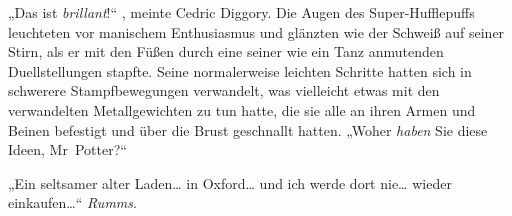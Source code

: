 „Das ist \emph{brillant}!“ , meinte Cedric Diggory. Die Augen des Super-Hufflepuffs leuchteten vor manischem Enthusiasmus und glänzten wie der Schweiß auf seiner Stirn, als er mit den Füßen durch eine seiner wie ein Tanz anmutenden Duellstellungen stapfte. Seine normalerweise leichten Schritte hatten sich in schwerere Stampfbewegungen verwandelt, was vielleicht etwas mit den verwandelten Metallgewichten zu tun hatte, die sie alle an ihren Armen und Beinen befestigt und über die Brust geschnallt hatten. „Woher \emph{haben} Sie diese Ideen, Mr~Potter?“

„Ein seltsamer alter Laden… in Oxford… und ich werde dort nie… wieder einkaufen…“ \emph{Rumms}.

